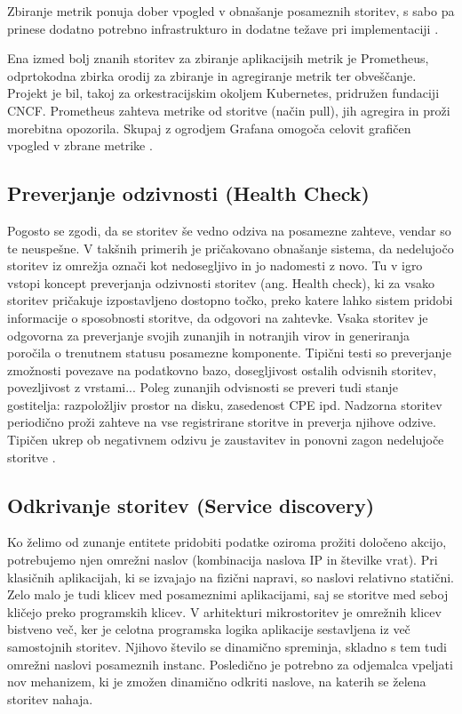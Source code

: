 \documentclass[a4paper, 12pt]{book}
\begin{document}
Zbiranje metrik ponuja dober vpogled v obnašanje posameznih storitev, s sabo pa prinese dodatno potrebno infrastrukturo in dodatne težave pri implementaciji \cite{ApplicationMetrics}.


Ena izmed bolj znanih storitev za zbiranje aplikacijsih metrik je Prometheus, odprtokodna zbirka orodij za zbiranje in agregiranje metrik ter obveščanje.
Projekt je bil, takoj za orkestracijskim okoljem Kubernetes, pridružen fundaciji CNCF.
Prometheus zahteva metrike od storitve (način pull), jih agregira in proži morebitna opozorila.
Skupaj z ogrodjem Grafana omogoča celovit grafičen vpogled v zbrane metrike \cite{Prometheus}.

\subsection{Preverjanje odzivnosti (Health Check)}

Pogosto se zgodi, da se storitev še vedno odziva na posamezne zahteve, vendar so te neuspešne.
V takšnih primerih je pričakovano obnašanje sistema, da nedelujočo storitev iz omrežja označi kot nedosegljivo in jo nadomesti z novo.
Tu v igro vstopi koncept preverjanja odzivnosti storitev (ang. Health check), ki za vsako storitev pričakuje izpostavljeno dostopno točko, preko katere lahko sistem pridobi informacije o sposobnosti storitve, da odgovori na zahtevke.
Vsaka storitev je odgovorna za preverjanje svojih zunanjih in notranjih virov in generiranja poročila o trenutnem statusu posamezne komponente.
Tipični testi so preverjanje zmožnosti povezave na podatkovno bazo, dosegljivost ostalih odvisnih storitev, povezljivost z vrstami...
Poleg zunanjih odvisnosti se preveri tudi stanje gostitelja: razpoložljiv prostor na disku, zasedenost CPE ipd.
Nadzorna storitev periodično proži zahteve na vse registrirane storitve in preverja njihove odzive.
Tipičen ukrep ob negativnem odzivu je zaustavitev in ponovni zagon nedelujoče storitve \cite{healthCheck}.

\subsection{Odkrivanje storitev (Service discovery)}

Ko želimo od zunanje entitete pridobiti podatke oziroma prožiti določeno akcijo, potrebujemo njen omrežni naslov (kombinacija naslova IP in številke vrat).
Pri klasičnih aplikacijah, ki se izvajajo na fizični napravi, so naslovi relativno statični.
Zelo malo je tudi klicev med posameznimi aplikacijami, saj se storitve med seboj kličejo preko programskih klicev.
V arhitekturi mikrostoritev je omrežnih klicev bistveno več, ker je celotna programska logika aplikacije sestavljena iz več samostojnih storitev.
Njihovo število se dinamično spreminja, skladno s tem tudi omrežni naslovi posameznih instanc.
Posledično je potrebno za odjemalca vpeljati nov mehanizem, ki je zmožen dinamično odkriti naslove, na katerih se želena storitev nahaja.
\end{document}
